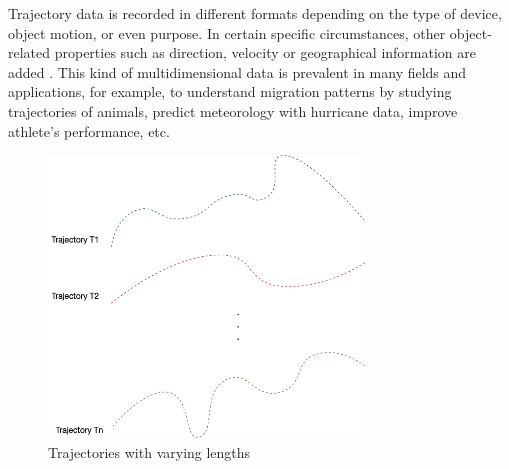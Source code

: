\documentclass[a4paper, 12pt]{article}
\begin{document}
Trajectory data is recorded in different formats depending on the type of device, object motion, or even purpose. In certain specific circumstances, other object-related properties such as direction, velocity or geographical information are added \citep{ying2011semantic,ying2010mining}. This kind of multidimensional data is prevalent in many fields and applications, for example, to understand migration patterns by studying trajectories of animals, predict meteorology with hurricane data, improve athlete’s performance, etc. 

\begin{figure}[ht]
    \centering
    \includegraphics[width=0.75\textwidth]{Trajectories.png}
    \caption{Trajectories with varying lengths}
    \label{fig1}
\end{figure}
\end{document}
